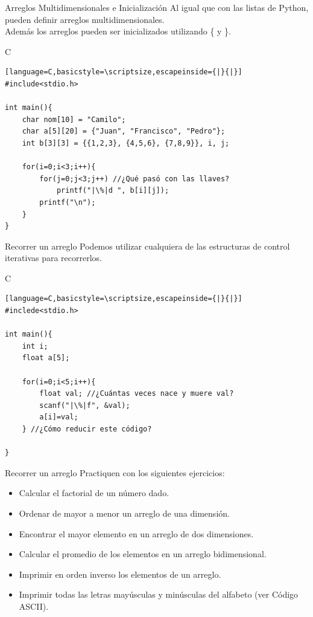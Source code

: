 \documentclass{beamer}
\begin{document}
\begin{frame}[fragile]{Arreglos Multidimensionales e Inicialización}
Al igual que con las listas de Python, pueden definir arreglos multidimensionales.\\

Además los arreglos pueden ser inicializados utilizando \{ y \}.
\begin{exampleblock}{C}
\begin{lstlisting}[language=C,basicstyle=\scriptsize,escapeinside={|}{|}]
#include<stdio.h>

int main(){
	char nom[10] = "Camilo";
	char a[5][20] = {"Juan", "Francisco", "Pedro"};	
	int b[3][3] = {{1,2,3}, {4,5,6}, {7,8,9}}, i, j;

	for(i=0;i<3;i++){
		for(j=0;j<3;j++) //¿Qué pasó con las llaves? 
			printf("|\%|d ", b[i][j]);
		printf("\n");
	}
}
\end{lstlisting}
\end{exampleblock}
\end{frame}

\begin{frame}[fragile]{Recorrer un arreglo}
Podemos utilizar cualquiera de las estructuras de control iterativas para recorrerlos. 
\begin{exampleblock}{C}
\begin{lstlisting}[language=C,basicstyle=\scriptsize,escapeinside={|}{|}]
#inclede<stdio.h>

int main(){
	int i;
	float a[5];
	
	for(i=0;i<5;i++){
		float val; //¿Cuántas veces nace y muere val?
		scanf("|\%|f", &val);
		a[i]=val;
	} //¿Cómo reducir este código?

}
\end{lstlisting}
\end{exampleblock}
\end{frame}

\begin{frame}[fragile]{Recorrer un arreglo}
Practiquen con los siguientes ejercicios:
\begin{itemize}
\item Calcular el factorial de un número dado.
\item Ordenar de mayor a menor un arreglo de una dimensión.
\item Encontrar el mayor elemento en un arreglo de dos dimensiones.
\item Calcular el promedio de los elementos en un arreglo bidimensional.
\item Imprimir en orden inverso los elementos de un arreglo. 
\item Imprimir todas las letras mayúsculas y minúsculas del alfabeto (ver Código ASCII).
\end{itemize}

\end{frame}
\end{document}
